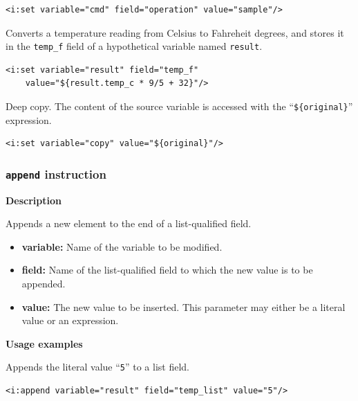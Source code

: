 \lstset{language=XML}
\begin{lstlisting}
<i:set variable="cmd" field="operation" value="sample"/>
\end{lstlisting}

Converts a temperature reading from Celsius to Fahreheit degrees, and stores it
in the \texttt{temp\_f} field of a hypothetical variable named \texttt{result}.

\lstset{language=XML}
\begin{lstlisting}
<i:set variable="result" field="temp_f"
    value="${result.temp_c * 9/5 + 32}"/>
\end{lstlisting}

Deep copy. The content of the source variable is accessed with the
``\lstinline!${original}!'' expression.

\lstset{language=XML}
\begin{lstlisting}
<i:set variable="copy" value="${original}"/>
\end{lstlisting}


\subsubsection{\texttt{append} instruction}

\textbf{Description}

Appends a new element to the end of a list-qualified field.

\begin{itemize}

    \item \textbf{variable:} Name of the variable to be modified.
    
    \item \textbf{field:} Name of the list-qualified field to which the new
        value is to be appended.

    \item \textbf{value:} The new value to be inserted. This parameter may
        either be a literal value or an expression.

\end{itemize}

\textbf{Usage examples}

Appends the literal value ``\texttt{5}'' to a list field.

\lstset{language=XML}
\begin{lstlisting}
<i:append variable="result" field="temp_list" value="5"/>
\end{lstlisting}


